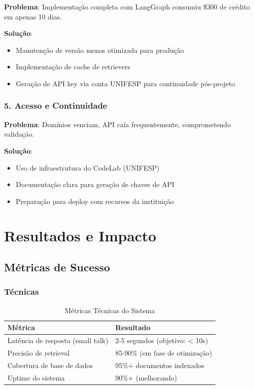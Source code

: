 \documentclass[12pt,a4paper]{report}
\begin{document}
\textbf{Problema}: Implementação completa com LangGraph consumiu \$300 de crédito em apenas 10 dias.

\textbf{Solução}:
\begin{itemize}
  \item Manutenção de versão menos otimizada para produção
  \item Implementação de cache de retrievers
  \item Geração de API key via conta UNIFESP para continuidade pós-projeto
\end{itemize}

\subsection{5. Acesso e Continuidade}

\textbf{Problema}: Domínios venciam, API caía frequentemente, comprometendo validação.

\textbf{Solução}:
\begin{itemize}
  \item Uso de infraestrutura do CodeLab (UNIFESP)
  \item Documentação clara para geração de chaves de API
  \item Preparação para deploy com recursos da instituição
\end{itemize}

\newpage

\chapter{Resultados e Impacto}

\section{Métricas de Sucesso}

\subsection{Técnicas}

\begin{table}[H]
\centering
\caption{Métricas Técnicas do Sistema}
\begin{tabular}{|l|l|}
\hline
\textbf{Métrica} & \textbf{Resultado} \\
\hline
Latência de resposta (small talk) & 2-5 segundos (objetivo: < 10s) \\
\hline
Precisão de retrieval & 85-90\% (em fase de otimização) \\
\hline
Cobertura de base de dados & 95\%+ documentos indexados \\
\hline
Uptime do sistema & 90\%+ (melhorando) \\
\hline
\end{tabular}
\end{table}
\end{document}
